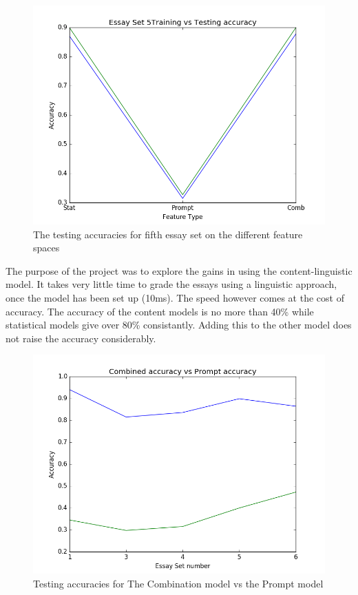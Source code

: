 \documentclass[BTech]{nitkdiss}
\begin{document}
\begin{figure}[h!]
\centering
\includegraphics[scale=0.70]{5TrainVTest.png}
\caption{The testing accuracies for fifth essay set on the different feature spaces}
\label{fig:set5}
\end{figure}

The purpose of the project was to explore the gains in using the content-linguistic model. It takes very little time to grade the essays using a linguistic approach, once the model has been set up (10ms). The speed however comes at the cost of accuracy. The accuracy of the content models is no more than 40\% while statistical models give over 80\% consistantly. Adding this to the other model does not raise the accuracy considerably.

\begin{figure}[h!]
\centering
\includegraphics[scale=0.70]{CombVPrompt.png}
\caption{Testing accuracies for The Combination model vs the Prompt model}
\label{fig:CombVPrompt}
\end{figure}
\end{document}

